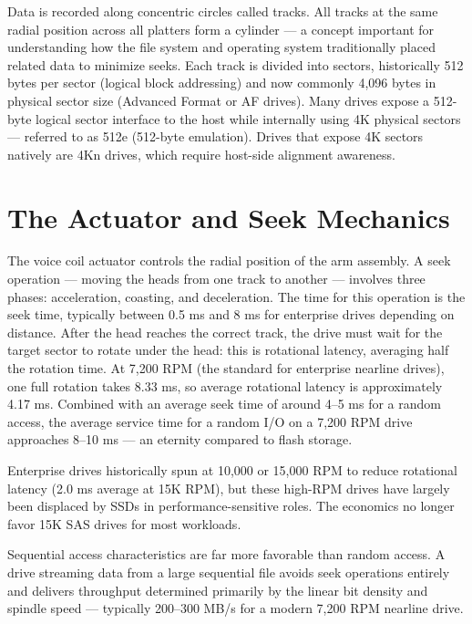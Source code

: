 Data is recorded along concentric circles called tracks. All tracks at the same radial position across all platters form a cylinder --- a concept important for understanding how the file system and operating system traditionally placed related data to minimize seeks. Each track is divided into sectors, historically 512 bytes per sector (logical block addressing) and now commonly 4,096 bytes in physical sector size (Advanced Format or AF drives). Many drives expose a 512-byte logical sector interface to the host while internally using 4K physical sectors --- referred to as 512e (512-byte emulation). Drives that expose 4K sectors natively are 4Kn drives, which require host-side alignment awareness.

\section{The Actuator and Seek Mechanics}
The voice coil actuator controls the radial position of the arm assembly. A seek operation --- moving the heads from one track to another --- involves three phases: acceleration, coasting, and deceleration. The time for this operation is the seek time, typically between 0.5 ms and 8 ms for enterprise drives depending on distance. After the head reaches the correct track, the drive must wait for the target sector to rotate under the head: this is rotational latency, averaging half the rotation time. At 7,200 RPM (the standard for enterprise nearline drives), one full rotation takes 8.33 ms, so average rotational latency is approximately 4.17 ms. Combined with an average seek time of around 4--5 ms for a random access, the average service time for a random I/O on a 7,200 RPM drive approaches 8--10 ms --- an eternity compared to flash storage.

Enterprise drives historically spun at 10,000 or 15,000 RPM to reduce rotational latency (2.0 ms average at 15K RPM), but these high-RPM drives have largely been displaced by SSDs in performance-sensitive roles. The economics no longer favor 15K SAS drives for most workloads.

Sequential access characteristics are far more favorable than random access. A drive streaming data from a large sequential file avoids seek operations entirely and delivers throughput determined primarily by the linear bit density and spindle speed --- typically 200--300 MB/s for a modern 7,200 RPM nearline drive.

